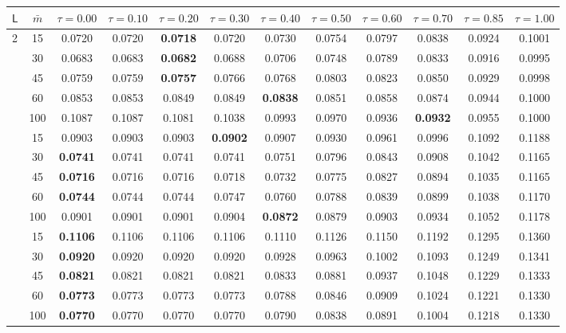 \begin{tabular}{lccccccccccc}
\toprule
$\mathsf L$ & $\bar m$ & $\tau=0.00$ & $\tau=0.10$ & $\tau=0.20$ & $\tau=0.30$ & $\tau=0.40$ & $\tau=0.50$ & $\tau=0.60$ & $\tau=0.70$ & $\tau=0.85$ & $\tau=1.00$ \\
\midrule
2 & 15 & 0.0720 & 0.0720 & \textbf{0.0718} & 0.0720 & 0.0730 & 0.0754 & 0.0797 & 0.0838 & 0.0924 & 0.1001 \\
 & 30 & 0.0683 & 0.0683 & \textbf{0.0682} & 0.0688 & 0.0706 & 0.0748 & 0.0789 & 0.0833 & 0.0916 & 0.0995 \\
 & 45 & 0.0759 & 0.0759 & \textbf{0.0757} & 0.0766 & 0.0768 & 0.0803 & 0.0823 & 0.0850 & 0.0929 & 0.0998 \\
 & 60 & 0.0853 & 0.0853 & 0.0849 & 0.0849 & \textbf{0.0838} & 0.0851 & 0.0858 & 0.0874 & 0.0944 & 0.1000 \\
 & 100 & 0.1087 & 0.1087 & 0.1081 & 0.1038 & 0.0993 & 0.0970 & 0.0936 & \textbf{0.0932} & 0.0955 & 0.1000 \\
\addlinespace
3 & 15 & 0.0903 & 0.0903 & 0.0903 & \textbf{0.0902} & 0.0907 & 0.0930 & 0.0961 & 0.0996 & 0.1092 & 0.1188 \\
 & 30 & \textbf{0.0741} & 0.0741 & 0.0741 & 0.0741 & 0.0751 & 0.0796 & 0.0843 & 0.0908 & 0.1042 & 0.1165 \\
 & 45 & \textbf{0.0716} & 0.0716 & 0.0716 & 0.0718 & 0.0732 & 0.0775 & 0.0827 & 0.0894 & 0.1035 & 0.1165 \\
 & 60 & \textbf{0.0744} & 0.0744 & 0.0744 & 0.0747 & 0.0760 & 0.0788 & 0.0839 & 0.0899 & 0.1038 & 0.1170 \\
 & 100 & 0.0901 & 0.0901 & 0.0901 & 0.0904 & \textbf{0.0872} & 0.0879 & 0.0903 & 0.0934 & 0.1052 & 0.1178 \\
\addlinespace
4 & 15 & \textbf{0.1106} & 0.1106 & 0.1106 & 0.1106 & 0.1110 & 0.1126 & 0.1150 & 0.1192 & 0.1295 & 0.1360 \\
 & 30 & \textbf{0.0920} & 0.0920 & 0.0920 & 0.0920 & 0.0928 & 0.0963 & 0.1002 & 0.1093 & 0.1249 & 0.1341 \\
 & 45 & \textbf{0.0821} & 0.0821 & 0.0821 & 0.0821 & 0.0833 & 0.0881 & 0.0937 & 0.1048 & 0.1229 & 0.1333 \\
 & 60 & \textbf{0.0773} & 0.0773 & 0.0773 & 0.0773 & 0.0788 & 0.0846 & 0.0909 & 0.1024 & 0.1221 & 0.1330 \\
 & 100 & \textbf{0.0770} & 0.0770 & 0.0770 & 0.0770 & 0.0790 & 0.0838 & 0.0891 & 0.1004 & 0.1218 & 0.1330 \\
\bottomrule
\end{tabular}

